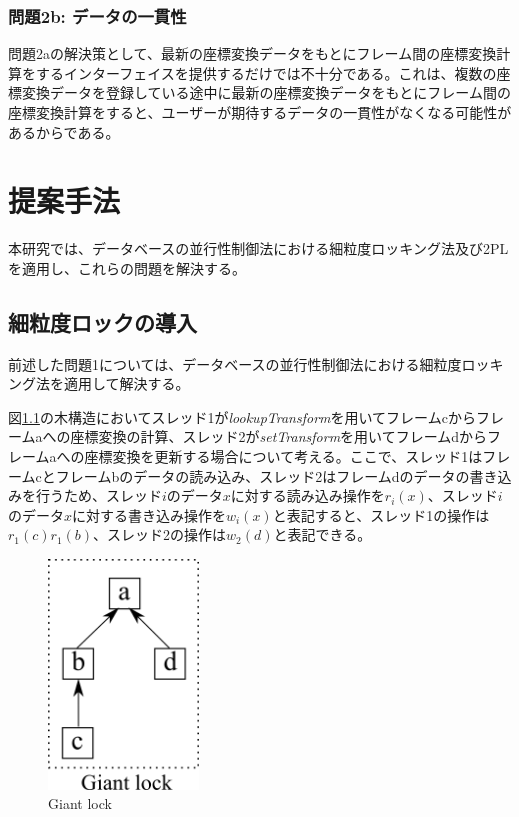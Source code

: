 \documentclass[a4paper]{jreport}	%
\begin{document}
\subsection*{問題2b: データの一貫性}
問題2aの解決策として、最新の座標変換データをもとにフレーム間の座標変換計算をするインターフェイスを提供するだけでは不十分である。これは、複数の座標変換データを登録している途中に最新の座標変換データをもとにフレーム間の座標変換計算をすると、ユーザーが期待するデータの一貫性がなくなる可能性があるからである。

\chapter{提案手法}
本研究では、データベースの並行性制御法における細粒度ロッキング法及び2PLを適用し、これらの問題を解決する。

\section{細粒度ロックの導入}
\label{section:intro-high-gran-lock}

前述した問題1については、データベースの並行性制御法における細粒度ロッキング法を適用して解決する。

図\ref{fig:giant-lock}の木構造においてスレッド1が\textit{lookupTransform}を用いてフレームcからフレームaへの座標変換の計算、スレッド2が\textit{setTransform}を用いてフレームdからフレームaへの座標変換を更新する場合について考える。ここで、スレッド1はフレームcとフレームbのデータの読み込み、スレッド2はフレームdのデータの書き込みを行うため、スレッド$i$のデータ$x$に対する読み込み操作を$r_i(x)$、スレッド$i$のデータ$x$に対する書き込み操作を$w_i(x)$と表記すると、スレッド1の操作は$r_1(c)r_1(b)$、スレッド2の操作は$w_2(d)$と表記できる。


\begin{figure}[h] 
\centering
\includegraphics[width=4cm]{gaint-lock}	
\caption{Giant lock}
\label{fig:giant-lock}
\end{figure}
\end{document}

